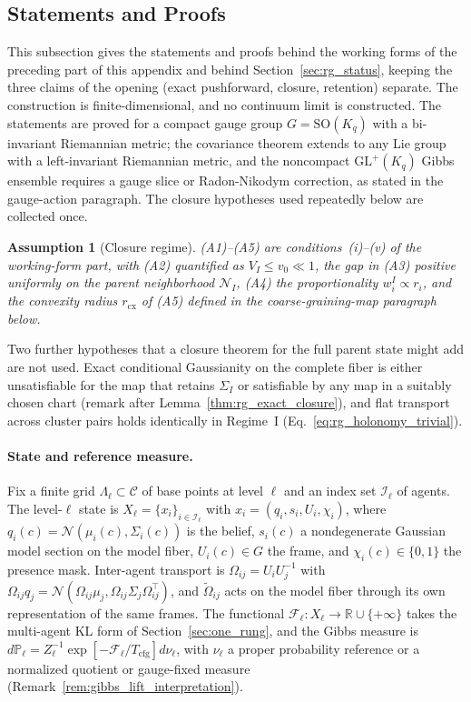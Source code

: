 \documentclass[11pt]{article}
\newtheorem{assumption}{Assumption}
\begin{document}
\subsection{Statements and Proofs}
\label{app:rigorous_rg}

This subsection gives the statements and proofs behind the working forms of the preceding part of this appendix and behind Section~\ref{sec:rg_status}, keeping the three claims of the opening (exact pushforward, closure, retention) separate. The construction is finite-dimensional, and no continuum limit is constructed. The statements are proved for a compact gauge group $G = \mathrm{SO}(K_q)$ with a bi-invariant Riemannian metric; the covariance theorem extends to any Lie group with a left-invariant Riemannian metric, and the noncompact $\mathrm{GL}^+(K_q)$ Gibbs ensemble requires a gauge slice or Radon-Nikodym correction, as stated in the gauge-action paragraph. The closure hypotheses used repeatedly below are collected once.

\begin{assumption}[Closure regime]
\label{ass:closure_regime}
(A1)--(A5) are conditions~(i)--(v) of the working-form part, with (A2) quantified as $V_I \le v_0 \ll 1$, the gap in (A3) positive uniformly on the parent neighborhood $\mathcal{N}_I$, (A4) the proportionality $w_i^I \propto r_i$, and the convexity radius $r_{\mathrm{cx}}$ of (A5) defined in the coarse-graining-map paragraph below.
\end{assumption}

Two further hypotheses that a closure theorem for the full parent state might add are not used. Exact conditional Gaussianity on the complete fiber is either unsatisfiable for the map that retains $\Sigma_I$ or satisfiable by any map in a suitably chosen chart (remark after Lemma~\ref{thm:rg_exact_closure}), and flat transport across cluster pairs holds identically in Regime~I (Eq.~\eqref{eq:rg_holonomy_trivial}).

\paragraph{State and reference measure.}
Fix a finite grid $\Lambda_\ell \subset \mathcal{C}$ of base points at level $\ell$ and an index set $\mathcal{I}_\ell$ of agents. The level-$\ell$ state is $X_\ell = \{x_i\}_{i \in \mathcal{I}_\ell}$ with $x_i = (q_i, s_i, U_i, \chi_i)$, where $q_i(c) = \mathcal{N}(\mu_i(c), \Sigma_i(c))$ is the belief, $s_i(c)$ a nondegenerate Gaussian model section on the model fiber, $U_i(c) \in G$ the frame, and $\chi_i(c) \in \{0, 1\}$ the presence mask. Inter-agent transport is $\Omega_{ij} = U_i U_j^{-1}$ with $\Omega_{ij} q_j = \mathcal{N}(\Omega_{ij}\mu_j, \Omega_{ij}\Sigma_j\Omega_{ij}^\top)$, and $\widetilde{\Omega}_{ij}$ acts on the model fiber through its own representation of the same frames. The functional $\mathcal{F}_\ell : X_\ell \to \mathbb{R} \cup \{+\infty\}$ takes the multi-agent KL form of Section~\ref{sec:one_rung}, and the Gibbs measure is $d\mathbb{P}_\ell = Z_\ell^{-1}\exp[-\mathcal{F}_\ell/T_{\mathrm{cfg}}]d\nu_\ell$, with $\nu_\ell$ a proper probability reference or a normalized quotient or gauge-fixed measure (Remark~\ref{rem:gibbs_lift_interpretation}).
\end{document}
